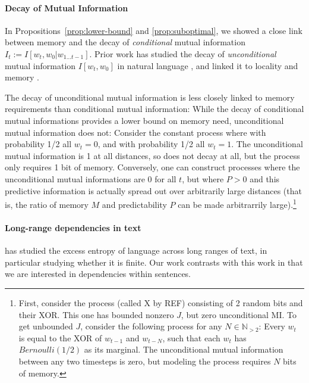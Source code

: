 \paragraph{Decay of Mutual Information}
In Propositions~\ref{prop:lower-bound} and \ref{prop:suboptimal}, we showed a close link between memory and the decay of \emph{conditional} mutual information $I_t := I[w_t, w_0 | w_{1\dots t-1}]$.
Prior work has studied the decay of \emph{unconditional} mutual information $I[w_t, w_0]$ in natural language \citep{ebeling-entropy-1994,lin-critical-2017}, and linked it to locality and memory \citep{futrell-noisy-context-2017}.

The decay of unconditional mutual information is less closely linked to memory requirements than conditional mutual information:
While the decay of conditional mutual informations provides a lower bound on memory need, unconditional mutual information does not:
Consider the constant process where with probability 1/2 all $w_t = 0$, and with probability 1/2 all $w_t = 1$. %
The unconditional mutual information is 1 at all distances, so does not decay at all, but the process only requires 1 bit of memory.
Conversely, one can construct processes where the unconditional mutual informations are 0 for all $t$, but where $P > 0$ and this predictive information is actually spread out over arbitrarily large distances (that is, the ratio of memory $M$ and predictability $P$ can be made arbitrarrily large).\footnote{First, consider the process (called X by REF) consisting of 2 random bits and their XOR. This one has bounded nonzero $J$, but zero unconditional MI. To get unbounded $J$, consider the following process for any $N \in \mathbb{N}_{>2}$: Every $w_t$ is equal to the XOR of $w_{t-1}$ and $w_{t-N}$, such that each $w_t$ has $Bernoulli(1/2)$ as its marginal. The unconditional mutual information between any two timesteps is zero, but modeling the process requires $N$ bits of memory.}



\paragraph{Long-range dependencies in text}    %
\cite{debowski-excess-2011} has studied the excess entropy of language across long ranges of text, in particular studying whether it is finite. %
Our work contrasts with this work in that we are interested in dependencies within sentences.


